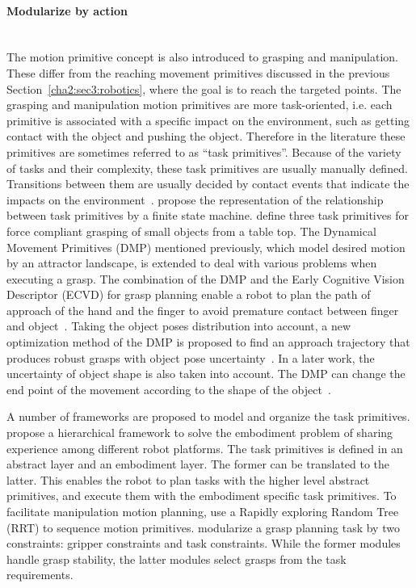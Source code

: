 \paragraph{Modularize by action}
~\\
The motion primitive concept is also introduced to grasping and manipulation. These differ from the reaching movement primitives discussed in the previous Section~\ref{cha2:sec3:robotics}, where the goal is to reach the targeted points. The grasping and manipulation motion primitives are more task-oriented, i.e. each primitive is associated with a specific impact on the environment, such as getting contact with the object and pushing the object. Therefore in the literature these primitives are sometimes referred to as ``task primitives''. Because of the variety of tasks and their complexity, these task primitives are usually manually defined. Transitions between them are usually decided by contact events that indicate the impacts on the environment~\citep{morrow1997manipulation}. \citet{michelman1994forming} propose the representation of the relationship between task primitives by a finite state machine. \citet{kazemi2012robust} define three task primitives for force compliant grasping of small objects from a table top. The Dynamical Movement Primitives (DMP) mentioned previously, which model desired motion by an attractor landscape, is extended to deal with various problems when executing a grasp. The combination of the DMP and the Early Cognitive Vision Descriptor (ECVD) for grasp planning enable a robot to plan the path of  approach of the hand and the finger to avoid premature contact between finger and object~\citep{kroemer2011grasping}. Taking the object poses distribution into account, a new optimization method of the DMP is proposed to find an approach trajectory that produces robust grasps with object pose uncertainty~\citep{stulp2011learning}. In a later work, the uncertainty of object shape is also taken into account. The DMP can change the end point of the movement according to the shape of the object~\citep{stulp2012reinforcement}.

A number of frameworks are proposed to model and organize the task primitives. \citet{laaksonen2010embodiment,felip2013manipulation} propose a hierarchical framework to solve the embodiment problem of sharing experience among different robot platforms. The task primitives is defined in an abstract layer and an embodiment layer.
The former can be translated to the latter. This enables the robot to plan tasks with the higher level abstract primitives, and execute them with the embodiment specific task primitives. To facilitate manipulation motion planning, \citet{barry2013manipulation} use a Rapidly exploring Random Tree (RRT) to sequence motion primitives. \citet{detry2013generalizing} modularize a grasp planning task by two constraints: gripper constraints and task constraints. While the former modules handle grasp stability, the latter modules select grasps from the task requirements.

